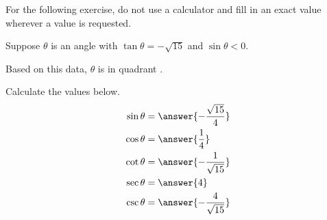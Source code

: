 \documentclass{ximera}
\author{Nela Lakos \and Kyle Parsons}
\begin{document}
\begin{exercise}

For the following exercise, do not use a calculator and fill in an exact value wherever a value is requested.

Suppose $\theta$ is an angle with $\tan\theta = -\sqrt{15}$ and $\sin\theta < 0$.

Based on this data, $\theta$ is in quadrant .

Calculate the values below.
\begin{align*}
\sin\theta &= \answer{-\frac{\sqrt{15}}{4}}\\
\cos\theta &= \answer{\frac{1}{4}}\\
\cot\theta &= \answer{-\frac{1}{\sqrt{15}}}\\
\sec\theta &= \answer{4}\\
\csc\theta &= \answer{-\frac{4}{\sqrt{15}}}
\end{align*}

\end{exercise}
\end{document}
